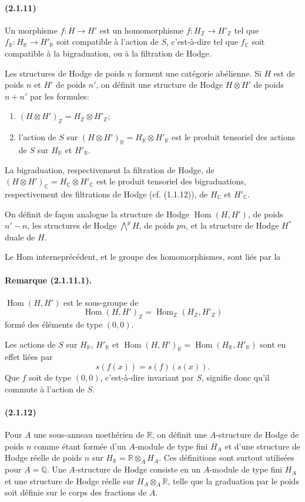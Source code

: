 \documentclass[10pt]{article}
\newcommand{\C}{\mathbb C}
\newcommand{\Q}{\mathbb Q}
\newcommand{\Z}{\mathbb Z}
\newcommand{\Hom}{\operatorname{Hom}}
\newcommand{\fg}{\guillemotright}
\newcommand{\og}{\guillemotleft}
\newcommand{\R}{\mathbb R}
\begin{document}
\paragraph{(2.1.11)} Un morphisme $f:H\to H'$ est un homomorphisme $f:H_\Z\to H'_\Z$ tel que $f_\R:H_\R\to H'_\R$ soit compatible à l'action de $S$, c'est-à-dire tel que $f_\C$ soit compatible à la bigraduation, ou à la filtration de Hodge.

Les structures de Hodge de poids $n$ forment une catégorie abélienne. Si $H$ est de poids $n$ et $H'$ de poids $n'$, on définit une structure de Hodge $H\otimes H'$ de poids $n+n'$ par les formules:
\begin{enumerate}[label=\alph*)]
\item $(H\otimes H')_\Z=H_\Z\otimes H'_\Z$;
\item l'action de $S$ sur $(H\otimes H')_\R=H_\R\otimes H'_\R$ est le produit tensoriel des actions de $S$ sur $H_\R$ et $H'_\R$.
\end{enumerate}
La bigraduation, respectivement la filtration de Hodge, de $(H\otimes H')_\C=H_\C\otimes H'_\C$ est le produit tensoriel des bigraduations, respectivement des filtrations de Hodge (cf. (1.1.12)), de $H_\C$ et $H'_\C$.

On définit de façon analogue la structure de Hodge $\Hom(H,H')$, de poids $n'-n$, les structures de Hodge $\bigwedge^p H$, de poids $pn$, et la structure de Hodge $H^*$ duale de $H$.

Le \og Hom interne\fg précédent, et le groupe des homomorphismes, sont liés par la

\paragraph{Remarque (2.1.11.1).} $\Hom(H,H')$ est le sous-groupe de
\[
\Hom(H,H')_\Z=\Hom_\Z(H_\Z,H'_\Z)
\]
formé des éléments de type $(0,0)$.

Les actions de $S$ sur $H_\R$, $H'_\R$ et $\Hom(H,H')_\R=\Hom(H_\R,H'_\R)$ sont en effet liées par
\[
s(f(x))=s(f)(s(x)).
\]
Que $f$ soit de type $(0,0)$, c'est-à-dire invariant par $S$, signifie donc qu'il commute à l'action de $S$.

\paragraph{(2.1.12)} Pour $A$ une sous-anneau noethérien de $\R$, on définit une $A$-structure de Hodge de poids $n$ comme étant formée d'un $A$-module de type fini $H_A$ et d'une structure de Hodge réelle de poids $n$ sur $H_\R=\R\otimes_AH_A$. Ces définitions sont surtout utilisées pour $A=\Q$. Une $A$-structure de Hodge consiste en un $A$-module de type fini $H_A$ et une structure de Hodge réelle sur $H_A\otimes_A\R$, telle que la graduation par le poids soit définie sur le corps des fractions de $A$.
\end{document}
